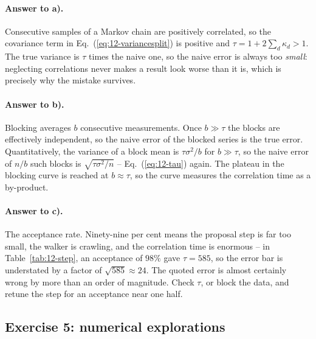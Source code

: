 \paragraph{Answer to a).}
Consecutive samples of a Markov chain are positively correlated, so the
covariance term in Eq.~(\ref{eq:12-variancesplit}) is positive and
$\tau=1+2\sum_d\kappa_d>1$.  The true variance is $\tau$ times the naive one,
so the naive error is always too \emph{small}: neglecting correlations never
makes a result look worse than it is, which is precisely why the mistake
survives.

\paragraph{Answer to b).}
Blocking averages $b$ consecutive measurements.  Once $b\gg\tau$ the blocks
are effectively independent, so the naive error of the blocked series is the
true error.  Quantitatively, the variance of a block mean is
$\tau\sigma^2/b$ for $b\gg\tau$, so the naive error of $n/b$ such blocks is
$\sqrt{\tau\sigma^2/n}$ -- Eq.~(\ref{eq:12-tau}) again.  The plateau in the
blocking curve is reached at $b\approx\tau$, so the curve measures the
correlation time as a by-product.

\paragraph{Answer to c).}
The acceptance rate.  Ninety-nine per cent means the proposal step is far too
small, the walker is crawling, and the correlation time is enormous -- in
Table~\ref{tab:12-step}, an acceptance of $98\%$ gave $\tau=585$, so the error
bar is understated by a factor of $\sqrt{585}\approx24$.  The quoted error is
almost certainly wrong by more than an order of magnitude.  Check $\tau$, or
block the data, and retune the step for an acceptance near one half.

\subsection*{Exercise 5: numerical explorations}

